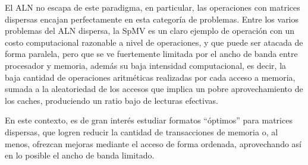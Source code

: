 El ALN no escapa de este paradigma, en particular, las operaciones con matrices dispersas encajan perfectamente en esta categoría de problemas. Entre los varios problemas del ALN dispersa, la SpMV es un claro ejemplo de operación con un costo computacional razonable a nivel de operaciones, y que puede ser atacada de forma paralela, pero que se ve fuertemente limitada por el ancho de banda entre procesador y memoria, 
además su baja intensidad computacional, es decir, la baja cantidad de operaciones aritméticas realizadas por cada acceso a memoria, sumada a la aleatoriedad de los accesos que implica un pobre aprovechamiento de los caches, produciendo un ratio bajo de lecturas efectivas.

En este contexto, es de gran interés estudiar formatos ``óptimos'' para matrices dispersas, que logren reducir la cantidad de transacciones de memoria o, al menos, ofrezcan mejoras mediante el acceso de forma ordenada, aprovechando así en lo posible el ancho de banda limitado.





